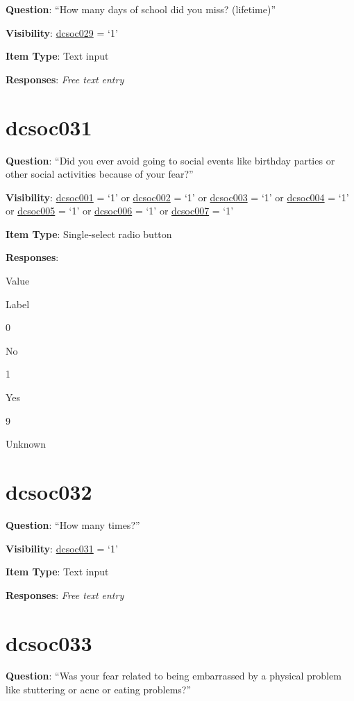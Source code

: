 \documentclass[]{book}
\begin{document}
\textbf{Question}: ``How many days of school did you miss? (lifetime)''

\textbf{Visibility}: \protect\hyperlink{dcsoc029}{dcsoc029} = `1'

\textbf{Item Type}: Text input

\textbf{Responses}: \emph{Free text entry}

\hypertarget{dcsoc031}{%
\section{dcsoc031}\label{dcsoc031}}

\textbf{Question}: ``Did you ever avoid going to social events like birthday parties or other social activities because of your fear?''

\textbf{Visibility}: \protect\hyperlink{dcsoc001}{dcsoc001} = `1' or \protect\hyperlink{dcsoc002}{dcsoc002} = `1' or \protect\hyperlink{dcsoc003}{dcsoc003} = `1' or \protect\hyperlink{dcsoc004}{dcsoc004} = `1' or \protect\hyperlink{dcsoc005}{dcsoc005} = `1' or \protect\hyperlink{dcsoc006}{dcsoc006} = `1' or \protect\hyperlink{dcsoc007}{dcsoc007} = `1'

\textbf{Item Type}: Single-select radio button

\textbf{Responses}:

Value

Label

0

No

1

Yes

9

Unknown

\hypertarget{dcsoc032}{%
\section{dcsoc032}\label{dcsoc032}}

\textbf{Question}: ``How many times?''

\textbf{Visibility}: \protect\hyperlink{dcsoc031}{dcsoc031} = `1'

\textbf{Item Type}: Text input

\textbf{Responses}: \emph{Free text entry}

\hypertarget{dcsoc033}{%
\section{dcsoc033}\label{dcsoc033}}

\textbf{Question}: ``Was your fear related to being embarrassed by a physical problem like stuttering or acne or eating problems?''
\end{document}
